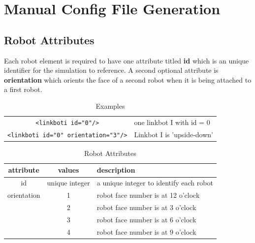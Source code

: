 \documentclass{article}
\begin{document}
\appendix
\section{Manual Config File Generation}
\subsection{Robot Attributes}
Each robot element is required to have one attribute titled \textbf{id} which is an unique identifier for the
simulation to reference.  A second optional attribute is \textbf{orientation} which orients the face of a
second robot when it is being attached to a first robot.

\begin{table}[H]
	\begin{center}
	\begin{tabular}{c | l}
		\hline 
		\verb|<linkboti id="0"/>| & one linkbot I with id = 0 \\
		\verb|<linkboti id="0" orientation="3"/>| & Linkbot I is 'upside-down' \\
		\hline
	\end{tabular}
	\caption{Examples}
	\label{tab:ex}
	\end{center}
\end{table}

\begin{table}[H]
	\begin{center}
	\begin{tabular}{c | c | l}
		\hline \hline
		\textbf{attribute} & \textbf{values} & \textbf{description} \\ \hline
		id & unique integer & a unique integer to identify each robot \\
		orientation & 1 & robot face number is at 12 o'clock \\
		 & 2 & robot face number is at 3 o'clock \\
		 & 3 & robot face number is at 6 o'clock \\
		 & 4 & robot face number is at 9 o'clock \\
		\hline \hline
	\end{tabular}
	\caption{Robot Attributes}
	\label{tab:attributes}
	\end{center}
\end{table}
\end{document}
